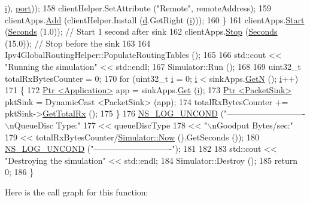 \begin{DoxyCode}
      \hyperlink{bernuolliDistribution_8m_a6f6ccfcf58b31cb6412107d9d5281426}{i}), \hyperlink{dsdv-manet_8cc_a8e0798404bf2cf5dabb84c5ba9a4f236}{port}));
158       clientHelper.SetAttribute (\textcolor{stringliteral}{"Remote"}, remoteAddress);
159       clientApps.\hyperlink{classns3_1_1ApplicationContainer_ad09ab1a1ad5849d518d5f4c262e38152}{Add} (clientHelper.Install (\hyperlink{buildings__pathloss_8m_a9f9b934daed17a4d3613b6886ff4cf4b}{d}.GetRight (\hyperlink{bernuolliDistribution_8m_a6f6ccfcf58b31cb6412107d9d5281426}{i})));
160     \}
161   clientApps.\hyperlink{classns3_1_1ApplicationContainer_a8eff87926507020bbe3e1390358a54a7}{Start} (\hyperlink{group__timecivil_ga33c34b816f8ff6628e33d5c8e9713b9e}{Seconds} (1.0)); \textcolor{comment}{// Start 1 second after sink}
162   clientApps.\hyperlink{classns3_1_1ApplicationContainer_adfc52f9aa4020c8714679b00bbb9ddb3}{Stop} (\hyperlink{group__timecivil_ga33c34b816f8ff6628e33d5c8e9713b9e}{Seconds} (15.0)); \textcolor{comment}{// Stop before the sink}
163 
164   Ipv4GlobalRoutingHelper::PopulateRoutingTables ();
165 
166   std::cout << \textcolor{stringliteral}{"Running the simulation"} << std::endl;
167   Simulator::Run ();
168 
169   uint32\_t totalRxBytesCounter = 0;
170   \textcolor{keywordflow}{for} (uint32\_t \hyperlink{bernuolliDistribution_8m_a6f6ccfcf58b31cb6412107d9d5281426}{i} = 0; \hyperlink{bernuolliDistribution_8m_a6f6ccfcf58b31cb6412107d9d5281426}{i} < sinkApps.\hyperlink{classns3_1_1ApplicationContainer_ad3068a3b77264a6527043beb7f2c05d8}{GetN} (); \hyperlink{bernuolliDistribution_8m_a6f6ccfcf58b31cb6412107d9d5281426}{i}++)
171     \{
172       \hyperlink{classns3_1_1Ptr}{Ptr <Application>} app = sinkApps.\hyperlink{classns3_1_1ApplicationContainer_a9e565807abd4213a56566a7ccd8d7509}{Get} (\hyperlink{bernuolliDistribution_8m_a6f6ccfcf58b31cb6412107d9d5281426}{i});
173       \hyperlink{classns3_1_1Ptr}{Ptr <PacketSink>} pktSink = DynamicCast <PacketSink> (app);
174       totalRxBytesCounter += pktSink->\hyperlink{classns3_1_1PacketSink_a11e7c4cc4a3c1e16e9abbb2cd3a12334}{GetTotalRx} ();
175     \}
176   \hyperlink{log-macros-disabled_8h_a0b36e5e182b37194f85ef1c5e979fb2e}{NS\_LOG\_UNCOND} (\textcolor{stringliteral}{"----------------------------\(\backslash\)nQueueDisc Type:"} 
177                  << queueDiscType 
178                  << \textcolor{stringliteral}{"\(\backslash\)nGoodput Bytes/sec:"} 
179                  << totalRxBytesCounter/\hyperlink{group__simulator_gac3635e2e87f7ce316c89290ee1b01d0d}{Simulator::Now} ().GetSeconds ()); 
180   \hyperlink{log-macros-disabled_8h_a0b36e5e182b37194f85ef1c5e979fb2e}{NS\_LOG\_UNCOND} (\textcolor{stringliteral}{"----------------------------"});
181 
182 
183   std::cout << \textcolor{stringliteral}{"Destroying the simulation"} << std::endl;
184   Simulator::Destroy ();
185   \textcolor{keywordflow}{return} 0;
186 \}
\end{DoxyCode}


Here is the call graph for this function\+:


